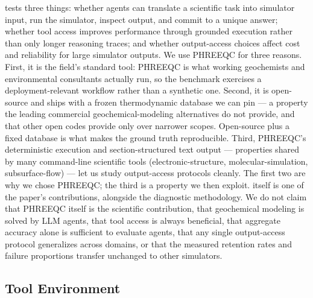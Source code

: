 \documentclass{article}
\begin{document}
\BenchName{} tests three things: whether agents can translate a scientific task into simulator input, run the simulator, inspect output, and commit to a unique answer; whether tool access improves performance through grounded execution rather than only longer reasoning traces; and whether output-access choices affect cost and reliability for large simulator outputs. We use PHREEQC for three reasons. First, it is the field's standard tool: PHREEQC is what working geochemists and environmental consultants actually run, so the benchmark exercises a deployment-relevant workflow rather than a synthetic one. Second, it is open-source and ships with a frozen thermodynamic database we can pin --- a property the leading commercial geochemical-modeling alternatives do not provide, and that other open codes provide only over narrower scopes. Open-source plus a fixed database is what makes the ground truth reproducible. Third, PHREEQC's deterministic execution and section-structured text output --- properties shared by many command-line scientific tools (electronic-structure, molecular-simulation, subsurface-flow) --- let us study output-access protocols cleanly. The first two are why we chose PHREEQC; the third is a property we then exploit. \BenchName{} itself is one of the paper's contributions, alongside the diagnostic methodology. We do not claim that PHREEQC itself is the scientific contribution, that geochemical modeling is solved by LLM agents, that tool access is always beneficial, that aggregate accuracy alone is sufficient to evaluate agents, that any single output-access protocol generalizes across domains, or that the measured retention rates and failure proportions transfer unchanged to other simulators.

\subsection{Tool Environment}
\label{sec:harness}
\end{document}
